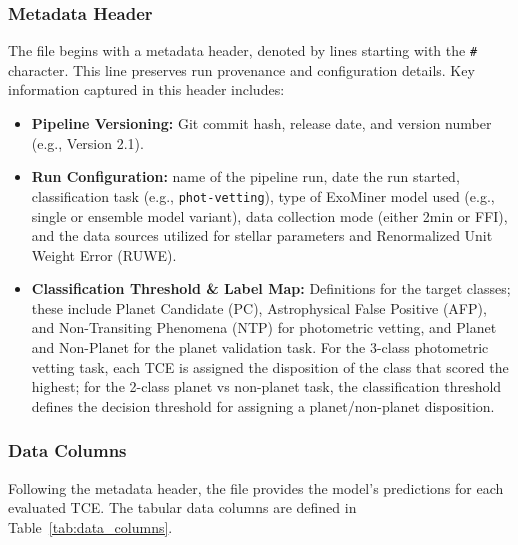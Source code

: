 \documentclass{article}
\begin{document}
\subsubsection*{Metadata Header}
The file begins with a metadata header, denoted by lines starting with the \texttt{\#} character. This line preserves run provenance and configuration details. Key information captured in this header includes:
\begin{itemize}
    \item \textbf{Pipeline Versioning:} Git commit hash, release date, and version number (e.g., Version 2.1).
    \item \textbf{Run Configuration:} name of the pipeline run, date the run started, classification task (e.g., \texttt{phot-vetting}), type of ExoMiner model used (e.g., single or ensemble model variant), data collection mode (either 2min or FFI), and the data sources utilized for stellar parameters and Renormalized Unit Weight Error (RUWE).
    \item \textbf{Classification Threshold \& Label Map:} Definitions for the target classes; these include Planet Candidate (PC), Astrophysical False Positive (AFP), and Non-Transiting Phenomena (NTP) for photometric vetting, and Planet and Non-Planet for the planet validation task. For the 3-class photometric vetting task, each TCE is assigned the disposition of the class that scored the highest; for the 2-class planet vs non-planet task, the classification threshold defines the decision threshold for assigning a planet/non-planet disposition.
\end{itemize}

\subsubsection*{Data Columns}
Following the metadata header, the file provides the model's predictions for each evaluated TCE. The tabular data columns are defined in Table~\ref{tab:data_columns}.
\end{document}
